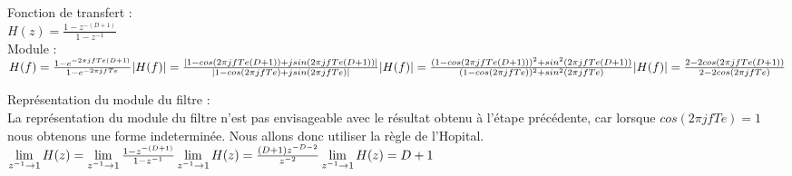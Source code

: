 Fonction de transfert :\\
$H(z)=\frac{1-z^{-(D+1)}}{1- z^{-1}}$\\

Module : \\
$H(f)=\frac{1-e^{-2\pi jfTe(D+1)}}{1- e^{-2\pi jfTe}}\\
|H(f)|=\frac{|1-cos(2\pi jfTe(D+1))+j sin(2\pi jfTe(D+1))|}{|1-cos(2\pi jfTe)+j sin(2\pi jfTe)|}\\
|H(f)|=\frac{(1-cos(2\pi jfTe(D+1)))^{2}+ sin^{2}(2\pi jfTe(D+1))}{(1-cos(2\pi jfTe))^{2}+ sin^{2}(2\pi jfTe)}\\
|H(f)|=\frac{2-2cos(2\pi jfTe(D+1))}{2-2cos(2\pi jfTe)}\\
$

Représentation du module du filtre :\\
La représentation du module du filtre n'est pas envisageable avec le résultat obtenu à l'étape précédente, car lorsque $cos(2\pi jfTe)=1$ nous obtenons une forme indeterminée. Nous allons donc utiliser la règle de l'Hopital.\\
$\lim\limits_{z^{-1}\rightarrow 1}H(z)=\lim\limits_{z^{-1}\rightarrow 1} \frac{1-z^{-(D+1)}}{1- z^{-1}}\\
\lim\limits_{z^{-1}\rightarrow 1}H(z)=\frac{(D+1)z^{-D-2}}{z^{-2}}\\
\lim\limits_{z^{-1}\rightarrow 1}H(z)=D+1\\
$\\
